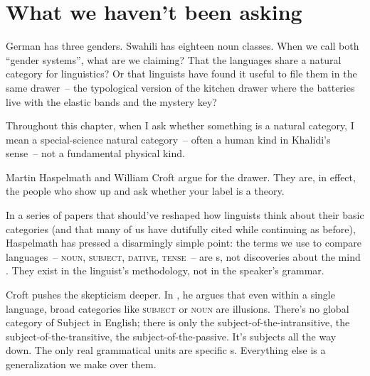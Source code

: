 
\chapter{What we haven't been asking}
\label{ch:what-we-havent-been-asking}

German has three genders. Swahili has eighteen noun classes. When we call both \enquote{gender systems}, what are we claiming? That the languages share a natural category for linguistics? Or that linguists have found it useful to file them in the same drawer~-- the typological version of the kitchen drawer where the batteries live with the elastic bands and the mystery key?

Throughout this chapter, when I ask whether something is a natural category, I mean a special-science natural category~-- often a human kind in Khalidi's sense~-- not a fundamental physical kind.

Martin Haspelmath and William Croft argue for the drawer. They are, in effect, the people who show up and ask whether your  label is a theory.

In a series of papers that should've reshaped how linguists think about their basic categories (and that many of us have dutifully cited while continuing as before), Haspelmath has pressed a disarmingly simple point: the terms we use to compare languages~-- \textsc{noun}, \textsc{subject}, \textsc{dative}, \textsc{tense}~-- are s, not discoveries about the mind \citep{haspelmath2010}. They exist in the linguist's methodology, not in the speaker's grammar.

Croft pushes the skepticism deeper. In \textcite{croft2001}, he argues that even within a single language, broad categories like \textsc{subject} or \textsc{noun} are illusions. There's no global category of Subject in English; there is only the subject-of-the-intransitive, the subject-of-the-transitive, the subject-of-the-passive. It's subjects all the way down. The only real grammatical units are specific s. Everything else is a generalization we make over them.

